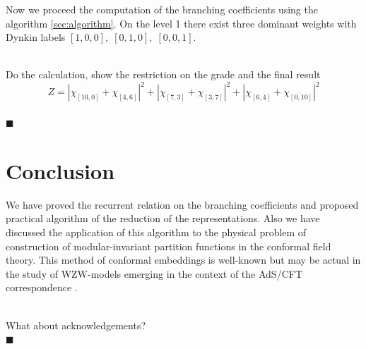 \documentclass[a4paper,12pt]{article}
\theoremstyle{definition} \newtheorem{Def}{Definition}
\newenvironment{comment}
{\par\noindent{\bf TODO}\\}
{\\\hfill$\scriptstyle\blacksquare$\par}
\begin{document}
Now we proceed the computation of the branching coefficients using the algorithm \ref{sec:algorithm}. 
On the level 1 there exist three dominant weights with Dynkin labels $[1,0,0], \; [0,1,0],\; [0,0,1]$.
\begin{comment}
  Do the calculation, show the restriction on the grade and the final result
  \begin{equation}
    \label{eq:35}
    Z=\left|\chi_{[10,0]}+\chi_{[4,6]}\right|^2+\left|\chi_{[7,3]}+\chi_{[3,7]}\right|^2+\left|\chi_{[6,4]}+\chi_{[0,10]}\right|^2
  \end{equation}
\end{comment}

\section{Conclusion}
\label{sec:conclusion}
We have proved the recurrent relation on the branching coefficients and proposed practical algorithm of the reduction of the representations. Also we have discussed the application of this algorithm to the physical problem of construction of modular-invariant partition functions in the conformal field theory. This method of conformal embeddings is well-known but may be actual in the study of WZW-models emerging in the context of the AdS/CFT correspondence \cite{Maldacena:2000hw,Maldacena:2000kv,Maldacena:2001km}. 
\begin{comment}
  What about acknowledgements? 
\end{comment}
{}

\end{document}
